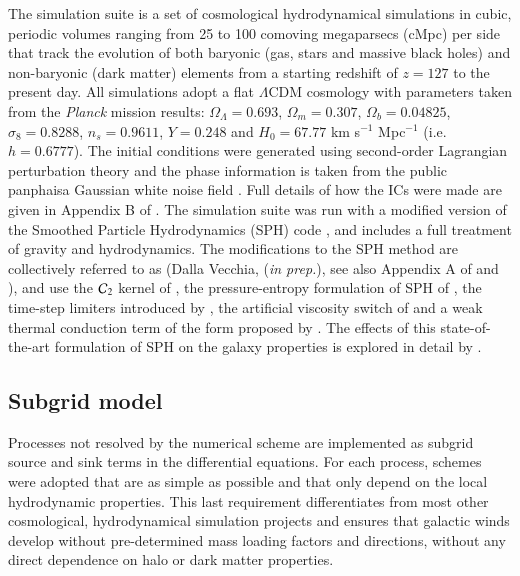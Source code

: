 The \eagle simulation suite is a set of cosmological hydrodynamical simulations
in cubic, periodic volumes ranging from 25 to 100 comoving megaparsecs (cMpc) per side that
track the evolution of both baryonic (gas, stars and massive black holes) and
non-baryonic (dark matter) elements from a starting redshift of $z = 127$ to the
present day. All simulations adopt a flat $\Lambda$CDM cosmology with parameters
taken from the \emph{Planck} mission \citep{Planck2013} results: $\Omega_\Lambda
= 0.693$, $\Omega_m = 0.307$, $\Omega_b = 0.04825$, $\sigma_8 = 0.8288$, $n_s =
0.9611$, $Y=0.248$ and $H_0 = 67.77$ km s$^{-1}$ Mpc$^{-1}$ (i.e. $h=0.6777$). The initial
conditions were generated using second-order Lagrangian perturbation theory
\citep{Jenkins2010} and the phase information is taken from the public {\sc
  panphaisa} Gaussian white noise field \citep{Jenkins2013}. Full details of how
the ICs were made are given in Appendix B of \cite{Schaye2015}. The simulation
suite was run with a modified version of the  Smoothed Particle
Hydrodynamics (SPH) code \citep[last described by][]{Springel2005},
and includes a full treatment of gravity and hydrodynamics. The modifications to
the SPH method are collectively referred to as \anarchy (Dalla Vecchia,
(\textit{in prep.}), see also Appendix A of \cite{Schaye2015} and
\cite{Schaller2015b}), and use the ${\cal C}_2$ kernel of \cite{Wendland1995},
the pressure-entropy formulation of SPH of \citet{Hopkins2013}, the time-step
limiters introduced by \cite{Durier2012}, the artificial viscosity switch of
\cite{Cullen2010} and a weak thermal conduction term of the form proposed by
\cite{Price2008}.  The effects of this state-of-the-art formulation of SPH on
the galaxy properties is explored in detail by \cite{Schaller2015b}.

\subsection{Subgrid model}
Processes not resolved by the numerical scheme are implemented as subgrid source
and sink terms in the differential equations. For each process, schemes were
adopted that are as simple as possible and that only depend on the local
hydrodynamic properties. This last requirement differentiates \eagle from most
other cosmological, hydrodynamical simulation projects
\citep[e.g.][]{Oppenheimer2010,Puchwein2013,Vogelsberger2014,Khandai2015} and
ensures that galactic winds develop without pre-determined mass loading factors
and directions, without any direct dependence on halo or dark matter
properties. 

